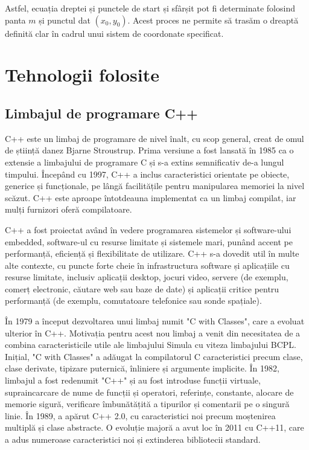 \documentclass[a4paper,12pt]{report}
\begin{document}
Astfel, ecuația dreptei și punctele de start și sfârșit pot fi determinate folosind panta $m$ și punctul dat $(x_0, y_0)$. Acest proces ne permite să trasăm o dreaptă definită clar în cadrul unui sistem de coordonate specificat.

\chapter{Tehnologii folosite}
\section{Limbajul de programare C++}
C++ este un limbaj de programare de nivel înalt, cu scop general, creat de omul de știință danez Bjarne Stroustrup. Prima versiune a fost lansată în 1985 ca o extensie a limbajului de programare C și s-a extins semnificativ de-a lungul timpului. Începând cu 1997, C++ a inclus caracteristici orientate pe obiecte, generice și funcționale, pe lângă facilitățile pentru manipularea memoriei la nivel scăzut. C++ este aproape întotdeauna implementat ca un limbaj compilat, iar mulți furnizori oferă compilatoare.

C++ a fost proiectat având în vedere programarea sistemelor și software-ului embedded, software-ul cu resurse limitate și sistemele mari, punând accent pe performanță, eficiență și flexibilitate de utilizare. C++ s-a dovedit util în multe alte contexte, cu puncte forte cheie în infrastructura software și aplicațiile cu resurse limitate, inclusiv aplicații desktop, jocuri video, servere (de exemplu, comerț electronic, căutare web sau baze de date) și aplicații critice pentru performanță (de exemplu, comutatoare telefonice sau sonde spațiale).

În 1979 a început dezvoltarea unui limbaj numit "C with Classes", care a evoluat ulterior în C++. Motivația pentru acest nou limbaj a venit din necesitatea de a combina caracteristicile utile ale limbajului Simula cu viteza limbajului BCPL. Inițial, "C with Classes" a adăugat la compilatorul C caracteristici precum clase, clase derivate, tipizare puternică, înliniere și argumente implicite. În 1982, limbajul a fost redenumit "C++" și au fost introduse funcții virtuale, supraincarcare de nume de funcții și operatori, referințe, constante, alocare de memorie sigură, verificare îmbunătățită a tipurilor și comentarii pe o singură linie. În 1989, a apărut C++ 2.0, cu caracteristici noi precum moștenirea multiplă și clase abstracte. O evoluție majoră a avut loc în 2011 cu C++11, care a adus numeroase caracteristici noi și extinderea bibliotecii standard.
\end{document}
